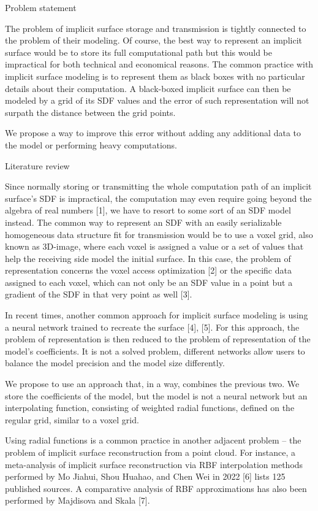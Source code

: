 \documentclass[12pt,a4paper]{article}
\begin{document}
Problem statement
\par
The problem of implicit surface storage and transmission is tightly connected to the problem of their modeling. Of course, the best way to represent an implicit surface would be to store its full computational path but this would be impractical for both technical and economical reasons. The common practice with implicit surface modeling is to represent them as black boxes with no particular details about their computation. A black-boxed implicit surface can then be modeled by a grid of its SDF values and the error of such representation will not surpath the distance between the grid points.
\par
We propose a way to improve this error without adding any additional data to the model or performing heavy computations.
\par
Literature review
\par
Since normally storing or transmitting the whole computation path of an implicit surface’s SDF is impractical, the computation may even require going beyond the algebra of real numbers [1], we have to resort to some sort of an SDF model instead. The common way to represent an SDF with an easily serializable homogeneous data structure fit for transmission would be to use a voxel grid, also known as 3D-image, where each voxel is assigned a value or a set of values that help the receiving side model the initial surface. In this case, the problem of representation concerns the voxel access optimization [2] or the specific data assigned to each voxel, which can not only be an SDF value in a point but a gradient of the SDF in that very point as well [3].
\par
In recent times, another common approach for implicit surface modeling is using a neural network trained to recreate the surface [4], [5]. For this approach, the problem of representation is then reduced to the problem of representation of the model’s coefficients. It is not a solved problem, different networks allow users to balance the model precision and the model size differently.
\par
We propose to use an approach that, in a way, combines the previous two. We store the coefficients of the model, but the model is not a neural network but an interpolating function, consisting of weighted radial functions, defined on the regular grid, similar to a voxel grid.
\par
Using radial functions is a common practice in another adjacent problem – the problem of implicit surface reconstruction from a point cloud. For instance, a meta-analysis of implicit surface reconstruction via RBF interpolation methods performed by Mo Jiahui, Shou Huahao, and Chen Wei in 2022 [6] lists 125 published sources. A comparative analysis of RBF approximations has also been performed by Majdisova and Skala [7].
\end{document}

